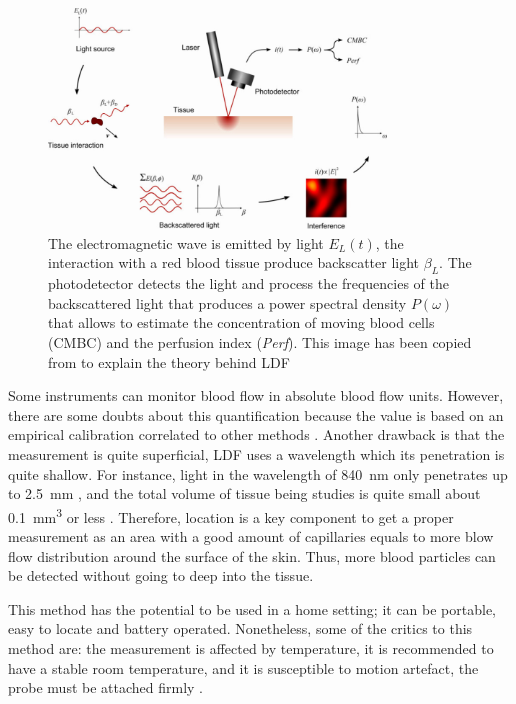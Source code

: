 \begin{figure}[!htpb]
	\centering
	\includegraphics[width=0.8\textwidth,keepaspectratio]{LDF}    
	\caption[Laser Doppler flowmetry theory overview]{The electromagnetic wave is emitted by light $E_L(t)$, the interaction with a red blood tissue produce backscatter light $\beta_L$. The photodetector detects the light and process the frequencies of the backscattered light that produces a power spectral density $P(\omega)$ that allows to estimate the concentration of moving blood cells (CMBC) and the perfusion index (\textit{Perf}). This image has been copied from \cite{fredriksson2007laser} to explain the theory behind LDF}
	\label{fig:LDF method}
\end{figure}

Some instruments can monitor blood flow in absolute blood flow units. However, there are some doubts about this quantification because the value is based on an empirical calibration correlated to other methods \cite{cooke1990laser}. Another drawback is that the measurement is quite superficial, LDF uses a wavelength which its penetration is quite shallow. For instance, light in the wavelength of \SI{840}{\nano \metre} only penetrates up to \SI{2.5}{\milli\metre} \cite{bashkatov2005optical}, and the total volume of tissue being studies is quite small about \SI{0.1}{\cubic\mm} or less \cite{briers2013laser}. Therefore, location is a key component to get a proper measurement as an area with a good amount of capillaries equals to more blow flow distribution around the surface of the skin. Thus, more blood particles can be detected without going to deep into the tissue. 

This method has the potential to be used in a home setting; it can be portable, easy to locate and battery operated. Nonetheless, some of the critics to this method are: the measurement is affected by temperature, it is recommended to have a stable room temperature, and it is susceptible to motion artefact, the probe must be attached firmly \cite{fredriksson2007laser}. 

